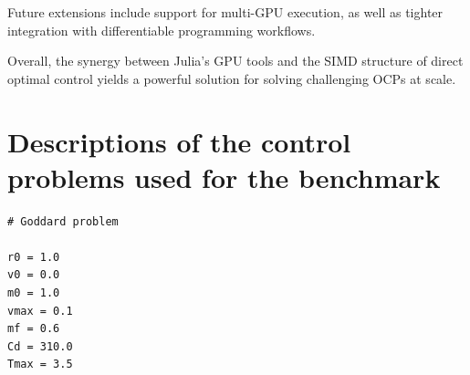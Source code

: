 
Future extensions include support for multi-GPU execution, as well as tighter integration with differentiable programming workflows.

Overall, the synergy between Julia’s GPU tools and the SIMD structure of direct optimal control yields a powerful solution for solving challenging OCPs at scale.


\small
% 



\appendix 

\section{Descriptions of the control problems used for the benchmark}

\begin{verbatim}
# Goddard problem

r0 = 1.0     
v0 = 0.0
m0 = 1.0 
vmax = 0.1 
mf = 0.6   
Cd = 310.0
Tmax = 3.5
\end{verbatim}

